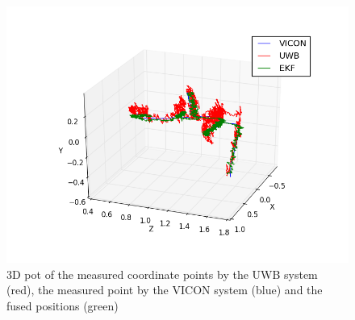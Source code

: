 \begin{figure}[ht!]\centering
	\includegraphics[width=1.0\textwidth]{figures/evaluation}
	\caption{3D pot of the measured coordinate points by the UWB system (red), the measured point by the VICON system (blue) and the fused positions (green)}\label{fig:evaluation}
\end{figure}
